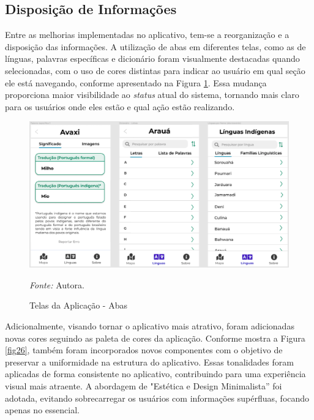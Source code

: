 \subsection{Disposição de Informações}
\label{sec:Disposicao de Informacoes}

Entre as melhorias implementadas no aplicativo, tem-se a reorganização e a disposição das informações. A utilização de abas em diferentes telas, como as de línguas, palavras específicas e dicionário foram 
visualmente destacadas quando selecionadas, com o uso de cores distintas para indicar ao usuário em qual seção ele está navegando, conforme apresentado na Figura \ref{fig25}. Essa mudança proporciona maior visibilidade ao \textit{status} atual do sistema, tornando mais 
claro para os usuários onde eles estão e qual ação estão realizando.

\begin{figure}[h!]
	\centering
	\caption{Telas da Aplicação - Abas}
	\begin{adjustbox}{center}
		\includegraphics[width=1\textwidth]{figuras/abas.eps}
	\end{adjustbox}
	\begin{tablenotes}[flushleft]
		\centering
		\item \textit{Fonte:} Autora.
	\end{tablenotes}
	\label{fig25}
\end{figure}

Adicionalmente, visando tornar o aplicativo mais atrativo, foram adicionadas novas cores seguindo as paleta de cores da aplicação. Conforme mostra a Figura \ref{fig26}, também foram incorporados novos componentes com o objetivo de preservar a uniformidade na estrutura do aplicativo.
Essas tonalidades foram aplicadas de forma consistente no aplicativo, contribuindo para uma experiência visual mais atraente. A abordagem de "Estética e Design Minimalista'' foi adotada, evitando sobrecarregar os usuários com informações supérfluas, focando apenas no essencial.

